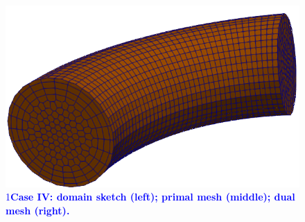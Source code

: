 \documentclass{article}
\def\ifUpdate{1}
\newcommand{\review}[1]{\textcolor{blue}{\if\ifUpdate1\textbf{#1}\fi}}
\begin{document}
\begin{figure}
    \includegraphics[scale=0.2]{paper_version/dual_mesh_bend.png}
    \caption{\review{Case IV: domain sketch (left); primal mesh (middle); dual mesh (right).}}
    \label{fig:bend_domain_sketch}
\end{figure}
\end{document}
